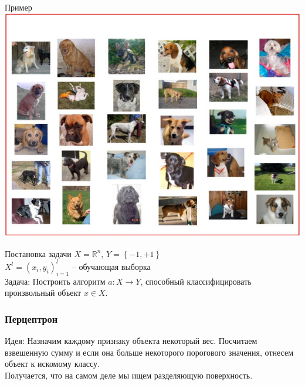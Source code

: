 \documentclass[10pt]{beamer}
\begin{document}
{
\begin{frame}{Пример}
  \centering
  \includegraphics[width=0.9 \textwidth, keepaspectratio]{images/dogs}
\end{frame}
}

\begin{frame}{Постановка задачи}
  $X = \mathbb{R}^n$, ${Y = \left\{ -1, + 1\right\}}$\\
  ${X^l = (x_i, y_i)_{i = 1}^l}$ -- обучающая выборка\\
  \bigbreak
  \alert{Задача}: Построить алгоритм ${a \colon X \rightarrow Y}$, способный классифицировать произвольный объект ${x \in X}$.\\
  
\end{frame}

{
\begin{frame}\frametitle{Перцептрон}
  \alert{Идея}: Назначим каждому признаку объекта некоторый вес. Посчитаем взвешенную сумму и если она больше некоторого порогового значения, отнесем объект к искомому классу. \\
  \bigbreak \pause
  Получается, что на самом деле мы ищем разделяющую поверхность.
\end{frame}
}
\end{document}
